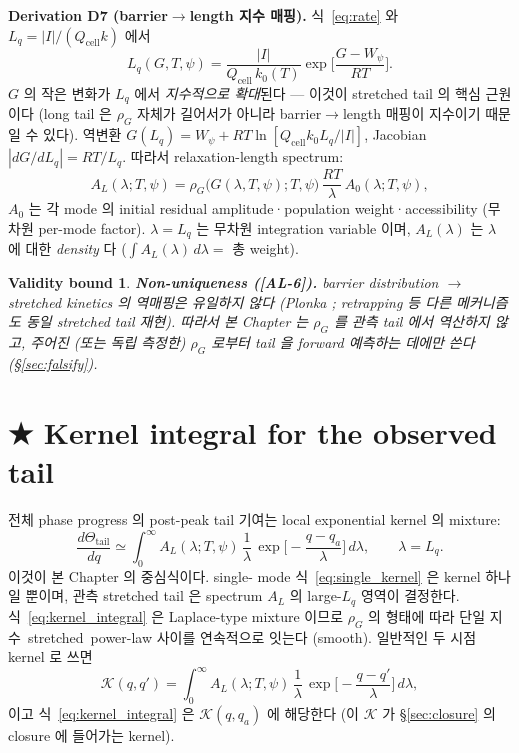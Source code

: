 \documentclass[11pt,a4paper]{article}
\newtheorem*{boundbox}{Validity bound}
\newcommand{\cell}{\mathrm{cell}}
\newcommand{\AL}[1]{\textsf{[AL-#1]}}
\begin{document}
\textbf{Derivation D7 (barrier$\to$length 지수 매핑).} 식~\eqref{eq:rate} 와 $L_q=|I|/(Q_\cell k)$
에서
\begin{equation}
\boxed{\;L_q(G,T,\psi)=\frac{|I|}{Q_\cell\,k_0(T)}\exp\!\Big[\frac{G-W_\psi}{RT}\Big].\;}
\label{eq:L_of_G}
\end{equation}
$G$ 의 작은 변화가 $L_q$ 에서 \emph{지수적으로 확대}된다 — 이것이 stretched tail 의 핵심
근원이다 (long tail 은 $\rho_G$ 자체가 길어서가 아니라 barrier$\to$length 매핑이 지수이기
때문일 수 있다). 역변환 $G(L_q)=W_\psi+RT\ln[Q_\cell k_0 L_q/|I|]$, Jacobian $|dG/dL_q|=RT/L_q$.
따라서 relaxation-length spectrum:
\begin{equation}
A_L(\lambda;T,\psi)=\rho_G\big(G(\lambda,T,\psi);T,\psi\big)\,\frac{RT}{\lambda}\,A_0(\lambda;T,\psi),
\label{eq:spectrum}
\end{equation}
$A_0$ 는 각 mode 의 initial residual amplitude·population weight·accessibility (무차원
per-mode factor). $\lambda=L_q$ 는 무차원 integration variable 이며, $A_L(\lambda)$ 는
$\lambda$ 에 대한 \emph{density} 다 ($\int A_L(\lambda)\,d\lambda=$ 총 weight).
\begin{boundbox}
\textbf{Non-uniqueness (\AL{6}).} barrier distribution $\to$ stretched kinetics 의 역매핑은
\emph{유일하지 않다} (Plonka \cite{plonka2001}; retrapping 등 다른 메커니즘도 동일 stretched
tail 재현). 따라서 본 Chapter 는 $\rho_G$ 를 관측 tail 에서 \emph{역산하지 않고},
주어진 (또는 독립 측정한) $\rho_G$ 로부터 tail 을 \emph{forward 예측}하는 데에만 쓴다
(\S\ref{sec:falsify}).
\end{boundbox}

\section{★ Kernel integral for the observed tail}\label{sec:kernel}
전체 phase progress 의 post-peak tail 기여는 local exponential kernel 의 mixture:
\begin{equation}
\boxed{\;\frac{d\Theta_\mathrm{tail}}{dq}\simeq\int_0^\infty A_L(\lambda;T,\psi)\,\frac1\lambda\,
\exp\!\Big[-\frac{q-q_a}{\lambda}\Big]\,d\lambda,\qquad \lambda=L_q.\;}
\label{eq:kernel_integral}
\end{equation}
이것이 본 Chapter 의 중심식이다. single-
mode 식~\eqref{eq:single_kernel} 은 kernel 하나일 뿐이며, 관측 stretched tail 은 spectrum
$A_L$ 의 large-$L_q$ 영역이 결정한다. 식~\eqref{eq:kernel_integral} 은 Laplace-type mixture
이므로 $\rho_G$ 의 형태에 따라 단일 지수~stretched~power-law 사이를 연속적으로 잇는다
(smooth). 일반적인 두 시점 kernel 로 쓰면
\begin{equation}
\mathcal K(q,q')=\int_0^\infty A_L(\lambda;T,\psi)\,\frac1\lambda\,\exp\!\Big[-\frac{q-q'}{\lambda}\Big]\,d\lambda,
\label{eq:K_def}
\end{equation}
이고 식~\eqref{eq:kernel_integral} 은 $\mathcal K(q,q_a)$ 에 해당한다 (이 $\mathcal K$ 가
\S\ref{sec:closure} 의 closure 에 들어가는 kernel).
\end{document}
